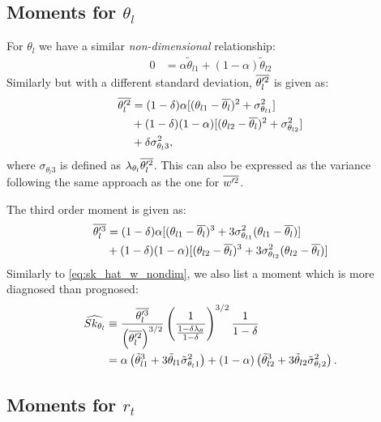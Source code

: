 \subsection{Moments for $\theta_l$}\label{subsec:lowerordermoments_thl}

For $\theta_l$ we have a similar \emph{non-dimensional} relationship:
\begin{align}
    \label{eq:thlp_bar_nondim}
    0 &= \alpha \tilde{\theta}_{l1} + (1 - \alpha) \tilde{\theta}_{l2}
\end{align}
Similarly but with a different standard deviation, $\overline{\theta_l'^2}$ is given as:
\begin{align}
    \label{eq:thlp2_bar}
    \overline{\theta_l'^2}
    &= (1 - \delta) \alpha [(\theta_{l1} - \overline{\theta_l})^2 + \sigma_{\theta_{l1}}^2] \nonumber\\
    &+ (1 - \delta) (1 - \alpha) [(\theta_{l2} - \overline{\theta_l})^2 + \sigma_{\theta_{l2}}^2] \nonumber\\
    &+ \delta \sigma_{\theta_l 3}^2,
\end{align}
where $\sigma_{\theta_l 3}$ is defined as $\lambda_{\theta_l} \overline{\theta_l'^2}$.
This can also be expressed as the variance following the same approach as the one for $\overline{w'^2}$.

The third order moment is given as:
\begin{align}
    \label{eq:theta_l_3_bar}
    \overline{\theta_l'^3}
    &= (1 - \delta) \alpha [(\theta_{l1} - \overline{\theta_l})^3
    + 3 \sigma_{\theta_{l1}}^2 (\theta_{l1} - \overline{\theta_l})] \nonumber\\
    &+ (1 - \delta) (1 - \alpha) [(\theta_{l2} - \overline{\theta_l})^3
    + 3 \sigma_{\theta_{l2}}^2 (\theta_{l2} - \overline{\theta_l})]
\end{align}
Similarly to \cref{eq:sk_hat_w_nondim}, we also list a moment which is more diagnosed than prognosed:
\begin{align}
    \widehat{Sk_{\theta_l}}
    &\equiv \frac{\overline{\theta_l'^3}}{\left(\overline{\theta_l'^2}\right)^{3/2}}
    \left(\frac{1}{\frac{1-\delta \lambda_\theta}{1-\delta}}\right)^{3/2}
    \frac{1}{1-\delta} \nonumber\\
    &= \alpha \left( \tilde{\theta}_{l1}^3 + 3 \tilde{\theta}_{l1} \tilde{\sigma}_{\theta_l 1}^2 \right)
    + (1 - \alpha) \left( \tilde{\theta}_{l2}^3 + 3 \tilde{\theta}_{l2} \tilde{\sigma}_{\theta_l 2}^2 \right).
    \label{eq:sk_hat_theta_l_nondim}
\end{align}

\subsection{Moments for $r_t$}\label{subsec:lowerordermoments_rt}

